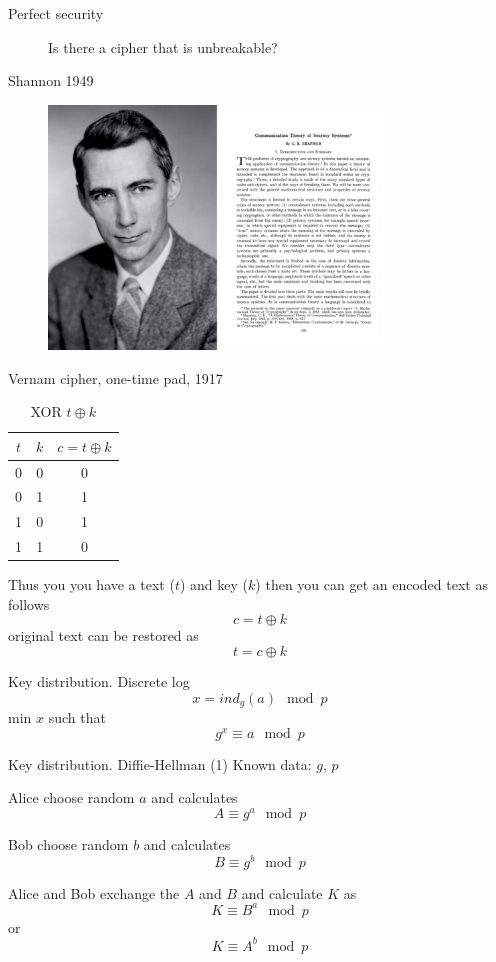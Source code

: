 \documentclass[10pt,pdf,hyperref={unicode}]{beamer}
\begin{document}
\begin{frame}{Perfect security}
 \begin{figure} 
   Is there a cipher that is unbreakable?
 \end{figure}
\end{frame}

\begin{frame}{Shannon 1949}
 \begin{figure} 
   \includegraphics[width=90mm,scale=0.5]{shannon.png}
 \end{figure}
\end{frame}

\begin{frame}{Vernam cipher, one-time pad, 1917}
  \begin{table}
    \centering
    \begin{tabular}{|c|c|c|}
      \hline
      $t$ & $k$ & $c = t \oplus k$ \\ \hline
      0  & 0 & 0 \\
      0  & 1 & 1 \\
      1  & 0 & 1 \\
      1  & 1 & 0 \\ \hline
    \end{tabular}
    \caption{XOR $t \oplus k$}
    \label{tblXOR}
  \end{table}
  Thus you you have a text ($t$) and key ($k$) then you can get an
  encoded text as follows
  \[
  c = t \oplus k
  \]
  original text can be restored as
  \[
  t = c \oplus k
  \]  
\end{frame}

\begin{frame}{Key distribution. Discrete log}
  \[
  x = ind_g\left(a\right) \mod{p}
  \]
  min $x$ such that
  \[
  g^x \equiv a \mod{p}
  \]
\end{frame}

\begin{frame}{Key distribution. Diffie-Hellman (1)}
  Known data: $g$, $p$
  
  Alice choose random $a$ and calculates
  \[
  A \equiv g^a \mod{p}
  \]

  Bob choose random $b$ and calculates
  \[
  B \equiv g^b \mod{p}
  \]

  Alice and Bob exchange the $A$ and $B$ and calculate $K$ as
  \[
  K \equiv B^a \mod{p}
  \]
  or
  \[
  K \equiv A^b \mod{p}
  \]
\end{frame}
\end{document}
